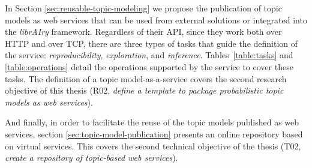 In Section \ref{sec:reusable-topic-modeling} we propose the publication of topic models as web services that can be used from external solutions or integrated into the \textit{librAIry} framework. Regardless of their API, since they work both over HTTP and over TCP, there are three types of tasks that guide the definition of the service: \textit{reproducibility}, \textit{exploration}, and \textit{inference}. Tables~\ref{table:tasks} and \ref{table:operations} detail the operations  supported by the service to cover these tasks. The definition of a topic model-as-a-service covers the second research objective of this thesis (R02, \textit{define a template to package probabilistic topic models as web services}).
 
And finally, in order to facilitate the reuse of the topic models published as web services, section \ref{sec:topic-model-publication} presents an online repository based on virtual services. This covers the second technical objective of the thesis (T02, \textit{create a repository of topic-based web services}). 
 

